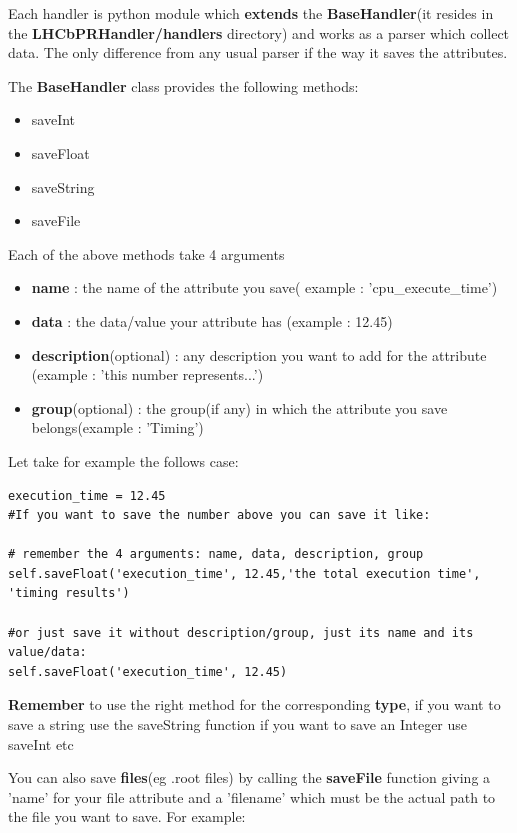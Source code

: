 \documentclass{lhcbnote}
\begin{document}
Each handler is python module which {\bf extends} the {\bf BaseHandler}(it resides in the {\bf LHCbPRHandler/handlers} directory)
and works as a parser which collect data. The only difference from any usual parser if the way it saves the attributes.

\vspace{2 mm}

The {\bf BaseHandler} class provides the following methods:
\begin{itemize}
\item			
saveInt
\item
saveFloat
\item
saveString
\item
saveFile
\end{itemize}

Each of the above methods take 4 arguments
\begin{itemize}
\item
{\bf name} : the name of the attribute you save( example : 'cpu\_execute\_time')  
\item
{\bf data} : the data/value your attribute has (example : 12.45)
\item
{\bf description}(optional) : any description you want to add for the attribute (example : 'this number represents...')
\item
{\bf group}(optional) : the group(if any) in which the attribute you save belongs(example : 'Timing')
\end{itemize}

Let take for example the follows case:

\begin{verbatim}
execution_time = 12.45  
#If you want to save the number above you can save it like:

# remember the 4 arguments: name, data, description, group
self.saveFloat('execution_time', 12.45,'the total execution time', 'timing results')
					
#or just save it without description/group, just its name and its value/data:
self.saveFloat('execution_time', 12.45)					
\end{verbatim}

{\bf Remember} to use the right method for the corresponding {\bf type}, if you want to save  a string use the saveString function 
if you want to save an Integer use saveInt etc

You can also save {\bf files}(eg .root files) by calling the {\bf saveFile} function giving a 'name' for your file attribute 
and a 'filename' which must be the actual path to the file you want to save. For example:
\end{document}
